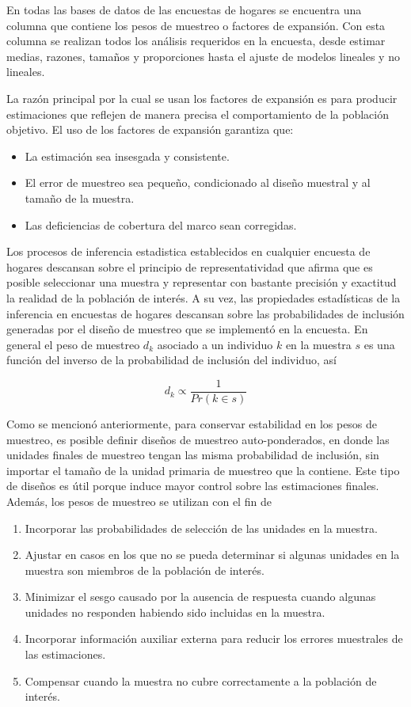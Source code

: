 \documentclass[
  10pt,
  spanish,
]{book}
\providecommand{\tightlist}{%
  \setlength{\itemsep}{0pt}\setlength{\parskip}{0pt}}
\begin{document}
En todas las bases de datos de las encuestas de hogares se encuentra una columna que contiene los pesos de muestreo o factores de expansión. Con esta columna se realizan todos los análisis requeridos en la encuesta, desde estimar medias, razones, tamaños y proporciones hasta el ajuste de modelos lineales y no lineales.

La razón principal por la cual se usan los factores de expansión es para producir estimaciones que reflejen de manera precisa el comportamiento de la población objetivo. El uso de los factores de expansión garantiza que:

\begin{itemize}
\tightlist
\item
  La estimación sea insesgada y consistente.
\item
  El error de muestreo sea pequeño, condicionado al diseño muestral y al tamaño de la muestra.
\item
  Las deficiencias de cobertura del marco sean corregidas.
\end{itemize}

Los procesos de inferencia estadistica establecidos en cualquier encuesta de hogares descansan sobre el principio de representatividad que afirma que es posible seleccionar una muestra y representar con bastante precisión y exactitud la realidad de la población de interés. A su vez, las propiedades estadísticas de la inferencia en encuestas de hogares descansan sobre las probabilidades de inclusión generadas por el diseño de muestreo que se implementó en la encuesta. En general el peso de muestreo \(d_k\) asociado a un individuo \(k\) en la muestra \(s\) es una función del inverso de la probabilidad de inclusión del individuo, así

\[
d_k \propto \frac{1}{Pr(k\in s)}
\]

Como se mencionó anteriormente, para conservar estabilidad en los pesos de muestreo, es posible definir diseños de muestreo auto-ponderados, en donde las unidades finales de muestreo tengan las misma probabilidad de inclusión, sin importar el tamaño de la unidad primaria de muestreo que la contiene. Este tipo de diseños es útil porque induce mayor control sobre las estimaciones finales. Además, los pesos de muestreo se utilizan con el fin de

\begin{enumerate}
\def\labelenumi{\arabic{enumi}.}
\tightlist
\item
  Incorporar las probabilidades de selección de las unidades en la muestra.
\item
  Ajustar en casos en los que no se pueda determinar si algunas unidades en la muestra son miembros de la población de interés.
\item
  Minimizar el sesgo causado por la ausencia de respuesta cuando algunas unidades no responden habiendo sido incluidas en la muestra.
\item
  Incorporar información auxiliar externa para reducir los errores muestrales de las estimaciones.
\item
  Compensar cuando la muestra no cubre correctamente a la población de interés.
\end{enumerate}
\end{document}
